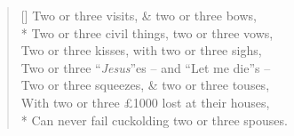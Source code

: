 \documentclass[MAIN]{subfiles}
\begin{document}
\settowidth{\versewidth}{With two or three \pounds1000 lost at their houses,}
\begin{verse}[\versewidth]
Two or three visits, \& two or three bows,\\*
Two or three civil things, two or three vows,\\
Two or three kisses, with two or three sighs,\\
Two or three ``\emph{Jesus}''es -- and ``Let me die''s --\\
Two or three squeezes, \& two or three touses,\\
With two or three \pounds1000 lost at their houses,\\*
Can never fail cuckolding two or three spouses.
\end{verse}
\end{document}
